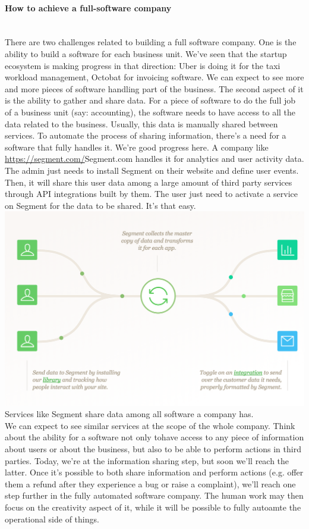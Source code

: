 \documentclass[12pt]{article}
\begin{document}
\paragraph{How to achieve a full-software company}
\\

There are two challenges related to building a full software company.
One is the ability to build a software for each business unit. We've seen that the startup ecosystem is making progress in that direction: Uber is doing it for the taxi workload management, Octobat for invoicing software. We can expect to see more and more pieces of software handling part of the business.
The second aspect of it is the ability to gather and share data. For a piece of software to do the full job of a business unit (say: accounting), the software needs to have access to all the data related to the business. Usually, this data is manually shared between services. To automate the process of sharing information, there's a need for a software that fully handles it.
We're good progress here. A company like \url{https://segment.com/}{Segment.com} handles it for analytics and user activity data. The admin just needs to install Segment on their website and define user events. Then, it will share this user data among a large amount of third party services through API integrations built by them. The user just need to activate a service on Segment for the data to be shared. It's that easy.
\\

\includegraphics[width=\textwidth]{segment}
Services like Segment share data among all software a company has.
\\

We can expect to see similar services at the scope of the whole company. Think about the ability for a software not only tohave access to any piece of information about users or about the business, but also to be able to perform actions in third parties. Today, we're at the information sharing step, but soon we'll reach the latter.
Once it's possible to both share information and perform actions (e.g. offer them a refund after they experience a bug or raise a complaint), we'll reach one step further in the fully automated software company.
The human work may then focus on the creativity aspect of it, while it will be possible to fully autoamte the operational side of things.
\end{document}
